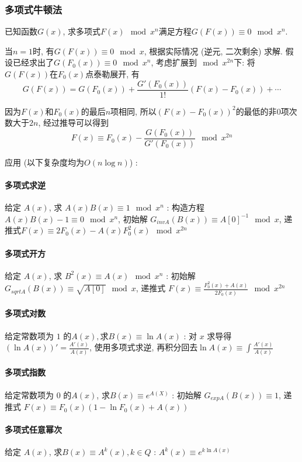 \subsubsection{多项式牛顿法}

已知函数$G(x)$, 求多项式$F(x)\mod x^n$满足方程$G(F(x))\equiv 0\mod x^n$.

当$n=1$时, 有$G(F(x))\equiv 0\mod x$, 根据实际情况 (逆元, 二次剩余) 求解. 假设已经求出了$G(F_0(x))\equiv 0\mod x^n$, 考虑扩展到$\mod x^{2n}$下: 将$G(F(x))$在$F_0(x)$点泰勒展开, 有
\[
G(F(x))=G(F_0(x)) +\frac{G'(F_0(x))}{1!}(F(x)-F_0(x))
 +\cdots
\]

因为$F(x)$和$F_0(x)$的最后$n$项相同, 所以$(F(x)-F_0(x))^2$的最低的非$0$项次数大于$2n$, 经过推导可以得到\[F(x)\equiv F_0(x)-\frac{G(F_0(x))}{G'(F_0(x))}\mod x^{2n}\]

应用 (以下复杂度均为$O(n\log n)$) : 

\paragraph{多项式求逆} 给定 $A(x)$, 求 $A(x)B(x)\equiv 1 \mod x^n$ : 构造方程 $A(x)B(x)-1\equiv 0\mod x^n$, 初始解 $G_{invA}(B(x))\equiv A[0]^{-1}\mod x$, 递推式$F(x)\equiv 2F_0(x)-A(x)F_0^2(x)\mod x^{2n}$

\paragraph{多项式开方} 给定 $A(x)$, 求 $B^2(x)\equiv A(x)\mod x^n$ : 初始解 $G_{sqrtA}(B(x))\equiv \sqrt{A[0]}\mod x$, 递推式 $F(x)\equiv \frac{F_0^2(x)+A(x)}{2F_0(x)}\mod x^{2n}$

\paragraph{多项式对数} 给定常数项为 $1$ 的$A(x), 求B(x)\equiv \ln A(x)$ : 对  $x$ 求导得 $(\ln A(x))'=\frac{A'(x)}{A(x)}$, 使用多项式求逆, 再积分回去$\ln A(x)\equiv \int\frac{A'(x)}{A(x)}$

\paragraph{多项式指数} 给定常数项为 $0​$ 的$A(x)​$, 求$B(x)\equiv e^{A(X)}​$ : 初始解 $G_{expA}(B(x))\equiv 1​$, 递推式 $F(x)\equiv F_0(x)(1-\ln F_0(x)+A(x))​$

\paragraph{多项式任意幂次} 给定 $A(x)$, 求$B(x)\equiv A^k(x),k\in Q$ : $A^k(x)\equiv e^{k\ln A(x)}$